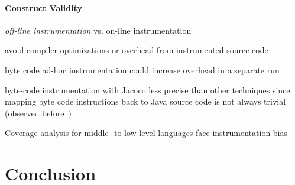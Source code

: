 \paragraph{Construct Validity}\label{sec:construct_validity}
\begin{compactitem}
	\item \textit{off-line instrumentation} vs. on-line instrumentation
	\begin{compactitem}
		\item avoid compiler optimizations or overhead from instrumented source code
		\item byte code ad-hoc instrumentation could increase overhead in a separate run
		\item byte-code instrumentation with Jacoco less precise than other techniques since mapping byte code instructions back to Java source code is not always trivial (observed before~\cite{luo_2019_cova})
	\end{compactitem}
	\item Coverage analysis for middle- to low-level languages face instrumentation bias
\end{compactitem}

\section{Conclusion}